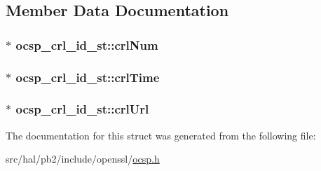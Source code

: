 \subsection{Member Data Documentation}
\subsubsection[{\texorpdfstring{crl\+Num}{crlNum}}]{$\ast$ ocsp\+\_\+crl\+\_\+id\+\_\+st\+::crl\+Num}\hypertarget{structocsp__crl__id__st_a65c4311de0c943b5e162c7ce6091b74e}{}\label{structocsp__crl__id__st_a65c4311de0c943b5e162c7ce6091b74e}
\subsubsection[{\texorpdfstring{crl\+Time}{crlTime}}]{$\ast$ ocsp\+\_\+crl\+\_\+id\+\_\+st\+::crl\+Time}\hypertarget{structocsp__crl__id__st_ac837981de065fbf9415d54739fedc2f5}{}\label{structocsp__crl__id__st_ac837981de065fbf9415d54739fedc2f5}
\subsubsection[{\texorpdfstring{crl\+Url}{crlUrl}}]{$\ast$ ocsp\+\_\+crl\+\_\+id\+\_\+st\+::crl\+Url}\hypertarget{structocsp__crl__id__st_a1054ab5bca3c14bd95723caf35a02dc7}{}\label{structocsp__crl__id__st_a1054ab5bca3c14bd95723caf35a02dc7}


The documentation for this struct was generated from the following file\+:\begin{DoxyCompactItemize}
\item 
src/hal/pb2/include/openssl/\hyperlink{ocsp_8h}{ocsp.\+h}\end{DoxyCompactItemize}
